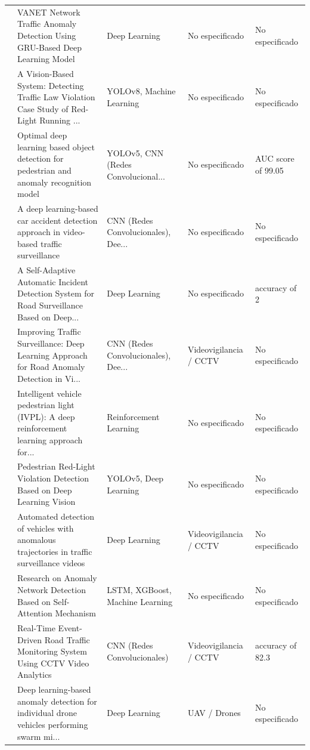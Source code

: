 \begin{table}[htbp]
\begin{tabular}{cp{7.5cm}p{2.8cm}p{2.8cm}p{2.8cm}}
\cite{almahadin2024vanet} & VANET Network Traffic Anomaly Detection Using GRU-Based Deep Learning Model & Deep Learning & No especificado & No especificado \\
\cite{fakhrurroja2024visionbased} & A Vision-Based System: Detecting Traffic Law Violation Case Study of Red-Light Running ... & YOLOv8, Machine Learning & No especificado & No especificado \\
\cite{shaik2024optimal} & Optimal deep learning based object detection for pedestrian and anomaly recognition model & YOLOv5, CNN (Redes Convolucional... & No especificado & AUC score of 99.05 \\
\cite{wu2024deep} & A deep learning-based car accident detection approach in video-based traffic surveillance & CNN (Redes Convolucionales), Dee... & No especificado & No especificado \\
\cite{bartolomhornillos2024selfadaptive} & A Self-Adaptive Automatic Incident Detection System for Road Surveillance Based on Deep... & Deep Learning & No especificado & accuracy of 2 \\
\cite{natha2024improving} & Improving Traffic Surveillance: Deep Learning Approach for Road Anomaly Detection in Vi... & CNN (Redes Convolucionales), Dee... & Videovigilancia / CCTV & No especificado \\
\cite{yazdani2023intelligent} & Intelligent vehicle pedestrian light (IVPL): A deep reinforcement learning approach for... & Reinforcement Learning & No especificado & No especificado \\
\cite{qu2023pedestrian} & Pedestrian Red-Light Violation Detection Based on Deep Learning Vision & YOLOv5, Deep Learning & No especificado & No especificado \\
\cite{fernandez2023automated} & Automated detection of vehicles with anomalous trajectories in traffic surveillance videos & Deep Learning & Videovigilancia / CCTV & No especificado \\
\cite{hu2023research} & Research on Anomaly Network Detection Based on Self-Attention Mechanism & LSTM, XGBoost, Machine Learning & No especificado & No especificado \\
\cite{tahir2023realtime} & Real-Time Event-Driven Road Traffic Monitoring System Using CCTV Video Analytics & CNN (Redes Convolucionales) & Videovigilancia / CCTV & accuracy of 82.3 \\
\cite{ahn2023deep} & Deep learning-based anomaly detection for individual drone vehicles performing swarm mi... & Deep Learning & UAV / Drones & No especificado \\

\end{tabular}
\end{table}
